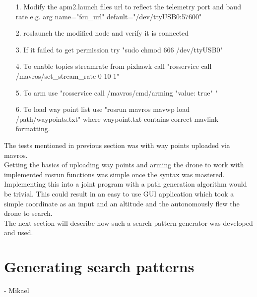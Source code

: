 \begin{itemize}

\item[1.] Modify the apm2.launch files url to reflect the telemetry port and baud rate  e.g. arg name="fcu\_url" default="/dev/ttyUSB0:57600" 
\item[2.] roslaunch the modified node and verify it is connected
\item[3.] If it failed to get permission try "sudo chmod 666 /dev/ttyUSB0"
\item[4.] To enable topics streamrate from pixhawk call "rosservice call /mavros/set\_stream\_rate 0 10 1"
\item[5.] To arm use "rosservice call /mavros/cmd/arming "value: true" "
\item[6.] To load way point list use "rosrun mavros mavwp load /path/waypoints.txt" where waypoint.txt contains correct mavlink formatting.

\end{itemize}

The tests mentioned in previous section was with way points uploaded via mavros.\\
Getting the basics of uploading way points and arming the drone to work with implemented rosrun functions was simple once the syntax was mastered. Implementing this into a joint program with a path generation algorithm would be trivial. This could result in an easy to use GUI application which took a simple coordinate as an input and an altitude and the autonomously flew the drone to search.\\
The next section will describe how such a search pattern generator was developed and used.

\section{Generating search patterns}
- Mikael\\
\newpage